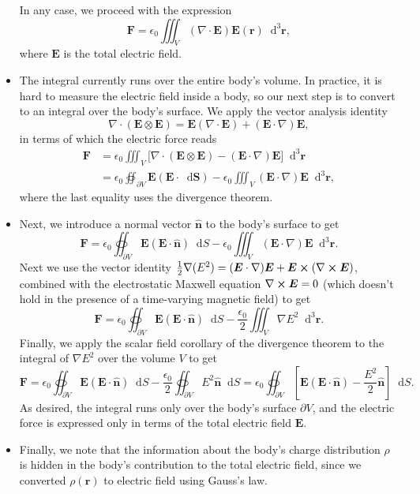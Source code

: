 \documentclass[11pt, a4paper]{article}
\newcommand{\diff}{\mathop{}\!\mathrm{d}} %
\newcommand{\dr}{\diff^{3} \r}  %
\renewcommand{\vec}[1]{\bm{#1}} %
\newcommand{\uvec}[1]{\hat{\vec{#1}}} %
\renewcommand{\r}{\vec{r}}
\newcommand{\E}{\vec{E}} %
\newcommand{\ee}{\epsilon_{0}}  %
\renewcommand{\div}{\nabla \cdot}
\renewcommand{\curl}{\nabla \cross}
\renewcommand{\grad}{\nabla}
\begin{document}
\begin{itemize}
	In any case, we proceed with the expression
	\begin{equation*}
		\vec{F} = \ee \iiint_{V} (\div \E) \E(\r) \dr,
	\end{equation*}
	where $ \E $ is the total electric field.
	

	\item The integral currently runs over the entire body's volume. In practice, it is hard to measure the electric field inside a body, so our next step is to convert to an integral over the body's surface. We apply the vector analysis identity
	\begin{equation*}
		\div (\E \otimes \E) = \E (\div \E) + (\E \cdot \grad) \E,
	\end{equation*}
	in terms of which the electric force reads
	\begin{align*}
		\vec{F} &= \ee \iiint_{V} \big[\div (\E \otimes \E) - (\E \cdot \grad) \E \big] \dr \\
		& = \ee \oiint_{\partial V} \E(\E \cdot \diff \vec{S}) - \ee \iiint_{V}(\E \cdot \grad)\E \dr,
	\end{align*}
	where the last equality uses the divergence theorem. 
	
	\item Next, we introduce a normal vector $ \uvec{n} $ to the body's surface to get
	\begin{equation*}
		\vec{F} = \ee \oiint_{\partial V} \E (\E \cdot \uvec{n}) \diff S - \ee \iiint_{V} (\E \cdot \grad)\E \dr.
	\end{equation*}
	Next we use the vector identity $ \frac{1}{2} \grad (E^{2}) = (\E \cdot \grad)\E + \E \cross (\curl \E) $, combined with the electrostatic Maxwell equation $ \curl \E = 0 $ (which doesn't hold in the presence of a time-varying magnetic field) to get
	\begin{equation*}
		\vec{F} = \ee \oiint_{\partial V} \E (\E \cdot \uvec{n}) \diff S - \frac{\ee}{2} \iiint_{V} \grad E^{2}\dr.
	\end{equation*}
	Finally, we apply the scalar field corollary of the divergence theorem to the integral of $ \grad E^{2} $ over the volume $ V $ to get
	\begin{equation*}
		\vec{F} = \ee \oiint_{\partial V} \E (\E \cdot \uvec{n}) \diff S - \frac{\ee}{2} \oiint_{\partial V}E^{2}\uvec{n} \diff S = \ee \oiint_{\partial V} \left[\E(\E\cdot \uvec{n}) - \frac{E^{2}}{2}\uvec{n} \right] \diff S.
	\end{equation*}
	As desired, the integral runs only over the body's surface $ \partial V $, and the electric force is expressed only in terms of the total electric field $ \E $.
	
	\item Finally, we note that the information about the body's charge distribution $ \rho $ is hidden in the body's contribution to the total electric field, since we converted $ \rho(\r) $ to electric field using Gauss's law.
	
\end{itemize}
\end{document}
